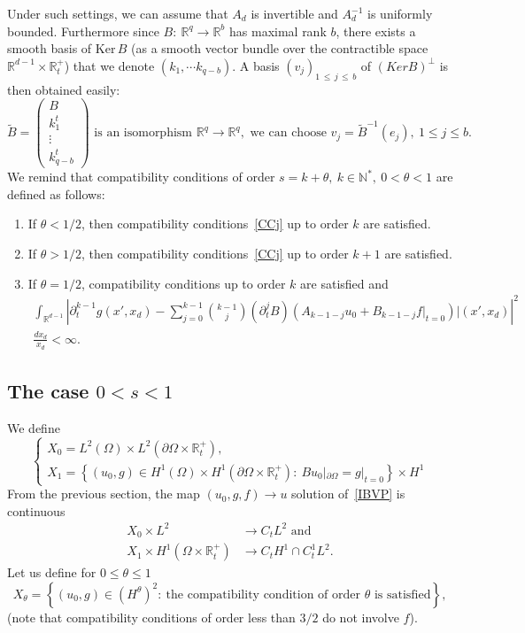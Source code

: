 \documentclass[10pt]{amsart}
\theoremstyle{definition}\newtheorem{defi}[theo]{Definition}\newtheorem{rema}[theo]{Remark}\newtheorem{exam}[theo]{Example}\newtheorem{exem}[theo]{Example}\newtheorem{nota}[theo]{Notation}
\newcommand{\R}{\mathbb{R}}
\newcommand{\N}{\mathbb{N}}
\newcommand{\Ker}{\mathrm{Ker}}
\begin{document}
Under such settings, we can assume that $A_d$ is invertible and $A_d^{-1}$ is uniformly bounded. Furthermore since $B:\ \R^q\to
\R^b$ has maximal rank $b$, there exists a smooth basis of $\Ker\,B$ (as a smooth vector bundle over the contractible space $\R^{d-1}\times \R_t^+$) that we denote $(k_1,\cdots k_{q-b})$. A basis $(v_j)_{1\,\leq\,j\,\leq\,b}$ of $(Ker B)^\perp$ is then obtained easily:
\[
\widetilde{B}=
\begin{pmatrix}
B\\
k_1^t\\
\vdots\\
k_{q-b}^t
\end{pmatrix}\text{ is an isomorphism }
\R^q\to \R^q,\text{ we can choose }
v_j=\widetilde{B}^{-1}(e_j),\ 1\leq j\leq b.
\]
We remind that compatibility conditions of order $s=k+\theta,\ k\in \N^*,\ 0<\theta<1$ are defined as follows:
\begin{enumerate}
\item If $\theta <1/2$, then compatibility conditions~\eqref{CCj} up to order $k$ are satisfied.
\item If $\theta>1/2$, then compatibility conditions~\eqref{CCj} up to order $k+1$ are satisfied.
\item If $\theta=1/2$, compatibility conditions up to order $k$ are satisfied and
\begin{multline*}
\int_{\R^{d-1}} \left|\partial_t^{k-1} g(x',x_d)-\sum_{j=0}^{k-1} \binom{k-1}{j}\left(\partial_t^jB\right)\left(A_{k-1-j}u_0+B_{k-1-j}f|_{t=0}\right)|(x',x_d)\right|^2\\
\frac{dx_d}{x_d}<\infty.
\end{multline*}
\end{enumerate}


\subsection{The case $0<s<1$} 
We define
\[
\left\{
\begin{array}{ll}
X_0=L^2(\Omega)\times L^2\left(\partial\Omega\times \R_t^+\right),\\
X_1=\left\{(u_0,g)\in H^1(\Omega)\times H^1\left(\partial\Omega\times \R_t^+\right):
\ Bu_0|_{\partial\Omega}=g|_{t=0}\right\}\times H^1
\end{array}
\right.
\]
From the previous section, the map $(u_0,g,f)\to u$ solution of~\eqref{IBVP} is continuous
\begin{align*}
X_0\times L^2&\to C_tL^2\text{ and }\\
X_1\times H^1\left(\Omega\times \R_t^+\right)&\to C_tH^1\cap C^1_tL^2.
\end{align*}
Let us define for $0\leq\theta \leq 1$
\[
X_\theta=\left\{(u_0,g)\in \left(H^\theta\right)^2:\ \text{the compatibility condition of order }\theta\text{ is satisfied}\right\},
\]
(note that compatibility conditions of order less than $3/2$ do not involve $f$).
\end{document}
